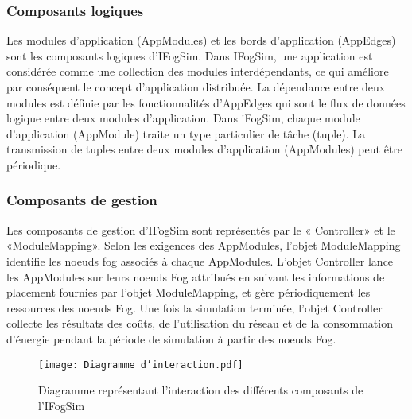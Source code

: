 \subsubsection{Composants logiques}
Les modules d'application (AppModules) et les bords d'application (AppEdges) sont les composants logiques d'IFogSim. Dans IFogSim, une application est considérée comme une collection des modules interdépendants, ce qui améliore par conséquent le concept d'application distribuée. La dépendance entre deux modules est définie par les fonctionnalités d'AppEdges qui sont le flux de données logique entre deux modules d'application. Dans iFogSim, chaque module d'application (AppModule) traite un type particulier de tâche (tuple). La transmission de tuples entre deux modules d'application (AppModules) peut être périodique.

\subsubsection{Composants de gestion}
Les composants de gestion d'IFogSim sont représentés par le « Controller» et le «ModuleMapping». Selon les exigences des AppModules, l'objet ModuleMapping identifie les noeuds fog associés à chaque AppModules. L'objet Controller lance les AppModules sur leurs noeuds Fog attribués en suivant les informations de placement fournies par l'objet ModuleMapping, et gère périodiquement les ressources des noeuds Fog. Une fois la simulation terminée, l'objet Controller collecte les résultats des coûts, de l'utilisation du réseau et de la consommation d'énergie pendant la période de simulation à partir des noeuds Fog.
\begin{figure}[H]
    \centering
    \texttt{[image: Diagramme d'interaction.pdf]}
    \caption{Diagramme représentant l'interaction des différents composants de l'IFogSim}
\end{figure}

